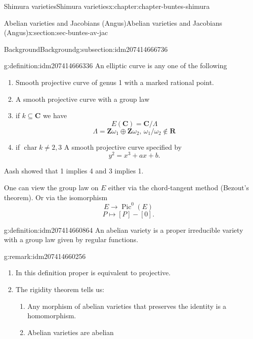\documentclass[oneside,10pt,]{book}
\numberwithin{equation}{section}
\newcommand{\ZZ}{\mathbf{Z}}
\newcommand{\RR}{\mathbf{R}}
\newcommand{\CC}{\mathbf{C}}
\DeclareMathOperator{\Pic}{Pic}
\DeclareMathOperator{\characteristic}{char}
\begin{document}
\begin{chapterptx}{Shimura varieties}{}{Shimura varieties}{}{}{x:chapter:chapter-buntes-shimura}
\begin{sectionptx}{Abelian varieties and Jacobians (Angus)}{}{Abelian varieties and Jacobians (Angus)}{}{}{x:section:sec-buntes-av-jac}
\begin{subsectionptx}{Background}{}{Background}{}{}{g:subsection:idm207414666736}
\begin{definition}{}{g:definition:idm207414666336}%
An elliptic curve is any one of the following%
\begin{enumerate}
\item{}Smooth projective curve of genus 1 with  a marked rational point.%
\item{}A smooth projective curve with a group law%
\item{}if \(k \subseteq \CC\) we have%
\begin{equation*}
E(\CC) = \CC/ \Lambda
\end{equation*}
%
\begin{equation*}
\Lambda = \ZZ \omega_1 \oplus \ZZ \omega_2,\, \omega_1/\omega_2 \not\in \RR
\end{equation*}
%
\item{}if \(\characteristic k \ne 2,3\) A smooth projective curve specified by%
\begin{equation*}
y^2=  x^3+ ax + b\text{.}
\end{equation*}
%
\end{enumerate}
%
\end{definition}
Aash showed that 1 implies 4 and 3 implies 1.%
\par
One can view the group law on \(E\) either via the chord-tangent method (Bezout's theorem). Or via the isomorphism%
\begin{equation*}
E \to \Pic^0(E)
\end{equation*}
%
\begin{equation*}
P \mapsto [P] - [0]\text{.}
\end{equation*}
%
\begin{definition}{}{g:definition:idm207414660864}%
An abelian variety is a proper irreducible variety with a group law given by regular functions.%
\end{definition}
\begin{remark}{}{g:remark:idm207414660256}%
%
\begin{enumerate}
\item{}In this definition proper is equivalent to projective.%
\item{}The rigidity theorem tells us:%
\begin{enumerate}
\item{}Any morphism of abelian varieties that preserves the identity is a homomorphism.%
\item{}Abelian varieties are abelian%
\end{enumerate}
%
\end{enumerate}

\end{remark}
\end{subsectionptx}
\end{sectionptx}
\end{chapterptx}
\end{document}
